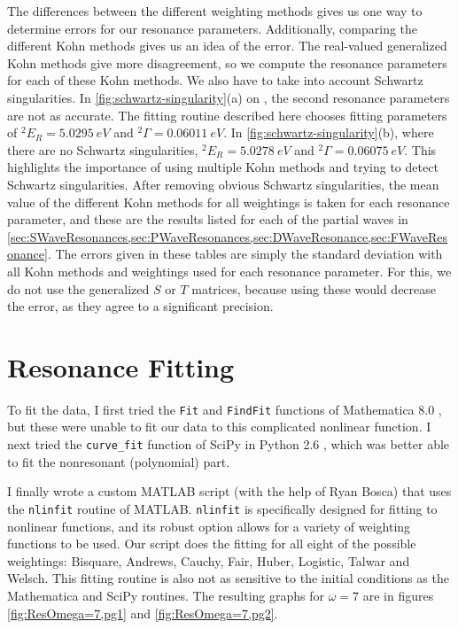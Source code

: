 \documentclass[Dissertation.tex]{subfiles}
\begin{document}
The differences between the different weighting methods gives us one way to determine errors for our resonance parameters. Additionally, comparing the different Kohn methods gives us an idea of the error. The real-valued generalized Kohn methods give more disagreement, so we compute the resonance parameters for each of these Kohn methods. We also have to take into account Schwartz singularities. In \cref{fig:schwartz-singularity}(a) on \pageref{fig:schwartz-singularity}, the second resonance parameters are not as accurate. The fitting routine described here chooses fitting parameters of $^2E_R = \SI{5.0295}{eV}$ and $^2\Gamma = \SI{0.06011}{eV}$.
In \cref{fig:schwartz-singularity}(b), where there are no Schwartz singularities, $^2E_R = \SI{5.0278}{eV}$ and $^2\Gamma = \SI{0.06075}{eV}$. This highlights the importance of using multiple Kohn methods and trying to detect Schwartz singularities. After removing obvious Schwartz singularities, the mean value of the different Kohn methods for all weightings is taken for each resonance parameter, and these are the results listed for each of the partial waves in \cref{sec:SWaveResonances,sec:PWaveResonances,sec:DWaveResonance,sec:FWaveResonance}. The errors given in these tables are simply the standard deviation with all Kohn methods and weightings used for each resonance parameter. For this, we do not use the generalized $S$ or $T$ matrices, because using these would decrease the error, as they agree to a significant precision.





\section{Resonance Fitting}
\label{sec:ResonanceFit}
To fit the data, I first tried the \texttt{Fit} and \texttt{FindFit} functions of Mathematica\textsuperscript{\textregistered} 8.0 \cite{Mathematica}, but these were unable to fit our data to this complicated nonlinear function. I next tried the \texttt{curve\_fit} function of SciPy \cite{SciPy} in Python\textsuperscript{\textregistered} 2.6 \cite{Python}, which was better able to fit the nonresonant (polynomial) part.

I finally wrote a custom MATLAB\textsuperscript{\textregistered} \cite{matlab} script (with the help of Ryan Bosca) that uses the \texttt{nlinfit} routine of MATLAB. \texttt{nlinfit} is specifically designed for fitting to nonlinear functions, and its robust option allows for a variety of weighting functions to be used. Our script does the fitting for all eight of the possible weightings: Bisquare, Andrews, Cauchy, Fair, Huber, Logistic, Talwar and Welsch. This fitting routine is also not as sensitive to the initial conditions as the Mathematica and SciPy routines. The resulting graphs for $\omega = 7$ are in figures \ref{fig:ResOmega=7,pg1} and \ref{fig:ResOmega=7,pg2}.
\end{document}
